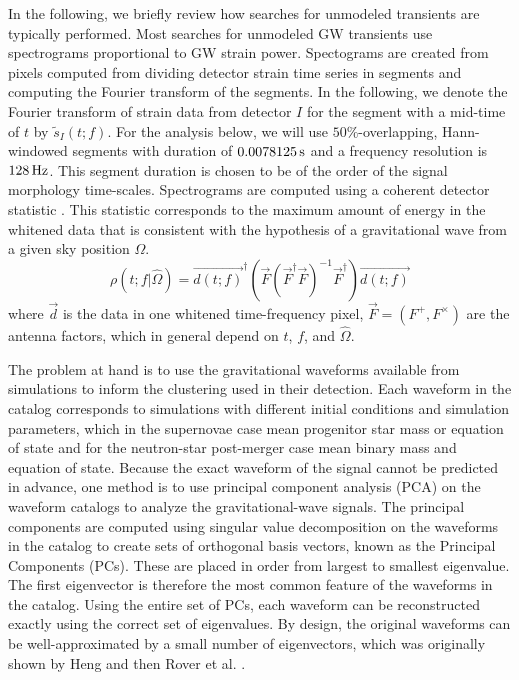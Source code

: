 \documentclass[prd,showpacs,superscriptaddress,twocolumn,
floatfix,preprintnumbers,altaffilletter]{revtex4}
\begin{document}
In the following, we briefly review how searches for unmodeled transients are typically performed.
Most searches for unmodeled GW transients use spectrograms proportional to GW strain power. 
Spectograms are created from pixels computed from dividing detector strain time series in segments and computing the Fourier transform of the segments. 
In the following, we denote the Fourier transform of strain data from detector $I$ for the segment with a mid-time of $t$ by $\tilde{s}_I(t;f)$. 
For the analysis below, we will use $50\%$-overlapping, Hann-windowed segments with duration of $\unit[0.0078125]{s}$ and a frequency resolution is $\unit[128]{Hz}$.
This segment duration is chosen to be of the order of the signal morphology time-scales.
Spectrograms are computed using a coherent detector statistic \cite{SuEA2010}. This statistic corresponds to the maximum amount of energy in the whitened data that is consistent with the hypothesis of a gravitational wave from a given sky position $\Omega$. 
\begin{equation}
\rho(t;f|\hat\Omega) = \vec{d(t;f)}^\dag (\vec{F} (\vec{F}^\dag \vec{F})^{-1} \vec{F}^\dag) \vec{d(t;f)}
\end{equation}
where $\vec{d}$ is the data in one whitened time-frequency pixel, $\vec{F} = (F^+, F^{\times})$ 
are the antenna factors, which in general depend on $t$, $f$, and $\hat\Omega$.

The problem at hand is to use the gravitational waveforms available from simulations to inform the clustering used in their detection.
Each waveform in the catalog corresponds to simulations with different initial conditions and simulation parameters, which in the supernovae case mean progenitor star mass or equation of state and for the neutron-star post-merger case mean binary mass and equation of state.
Because the exact waveform of the signal cannot be predicted in advance, one method is to use principal component analysis (PCA) on the waveform catalogs to analyze the gravitational-wave signals.
The principal components are computed using singular value decomposition on the waveforms in the catalog to create sets of orthogonal basis vectors, known as the Principal Components (PCs). These are placed in order from largest to smallest eigenvalue. The first eigenvector is therefore the most common feature of the waveforms in the catalog. Using the entire set of PCs, each waveform can be reconstructed exactly using the correct set of eigenvalues. By design, the original waveforms can be well-approximated by a small number of eigenvectors, which was originally shown by Heng \cite{Sio2009} and then Rover et al. \cite{RoBi2009}.
\end{document}
